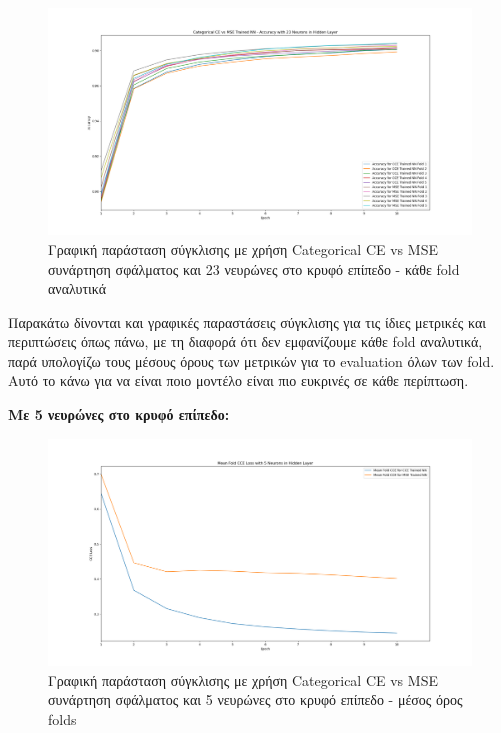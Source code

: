 \documentclass[12pt,a4paper]{article}
\begin{document}
\begin{figure}[H]
	\includegraphics[width=\textwidth]{9. CCE vs MSE - Accuracy - 23 Neurons.png}
	\caption{Γραφική παράσταση σύγκλισης με χρήση Categorical CE vs MSE συνάρτηση σφάλματος και 23 νευρώνες στο κρυφό επίπεδο - κάθε fold αναλυτικά}
\end{figure}

Παρακάτω δίνονται και γραφικές παραστάσεις σύγκλισης για τις ίδιες μετρικές και περιπτώσεις όπως πάνω, με τη διαφορά ότι δεν εμφανίζουμε κάθε fold αναλυτικά, παρά υπολογίζω τους μέσους όρους των μετρικών για το evaluation όλων των fold. Αυτό το κάνω για να είναι ποιο μοντέλο είναι πιο ευκρινές σε κάθε περίπτωση.

\textbf{Με 5 νευρώνες στο κρυφό επίπεδο:}

\begin{figure}[H]
	\includegraphics[width=\textwidth]{10. CCE vs MSE - CCE Loss - 5 Neurons - Mean.png}
	\caption{Γραφική παράσταση σύγκλισης με χρήση Categorical CE vs MSE συνάρτηση σφάλματος και 5 νευρώνες στο κρυφό επίπεδο - μέσος όρος folds}
\end{figure}
\end{document}
